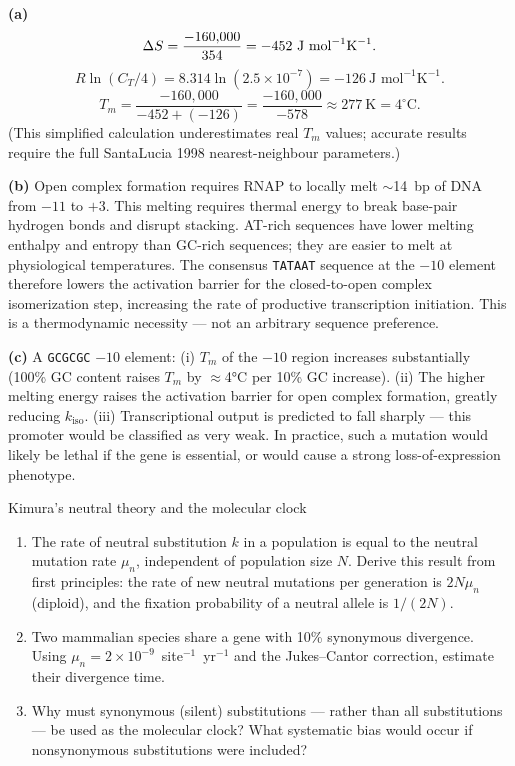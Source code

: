 \documentclass[12pt, a4paper, oneside]{report}
\begin{document}
\begin{solution}
  \textbf{(a)}
  \[
    \Delta S = \frac{-160{,}000}{354} = -452~\text{J mol}^{-1}\text{K}^{-1}.
  \]
  \[
    R\ln(C_T/4) = 8.314\ln(2.5\times10^{-7}) = -126~\text{J mol}^{-1}\text{K}^{-1}.
  \]
  \[
    T_m = \frac{-160{,}000}{-452 + (-126)} = \frac{-160{,}000}{-578}
        \approx 277~\text{K} = 4^\circ\text{C.}
  \]
  (This simplified calculation underestimates real $T_m$ values; accurate
  results require the full SantaLucia 1998 nearest-neighbour parameters.)

  \textbf{(b)} Open complex formation requires RNAP to locally melt
  $\sim$14~bp of DNA from $-11$ to $+3$. This melting requires thermal
  energy to break base-pair hydrogen bonds and disrupt stacking. AT-rich
  sequences have lower melting enthalpy and entropy than GC-rich sequences;
  they are easier to melt at physiological temperatures. The consensus
  \texttt{TATAAT} sequence at the $-10$ element therefore lowers the
  activation barrier for the closed-to-open complex isomerization step,
  increasing the rate of productive transcription initiation. This is
  a thermodynamic necessity — not an arbitrary sequence preference.

  \textbf{(c)} A \texttt{GCGCGC} $-10$ element: (i) $T_m$ of the $-10$
  region increases substantially (100\% GC content raises $T_m$ by
  $\approx$4°C per 10\% GC increase). (ii) The higher melting energy
  raises the activation barrier for open complex formation, greatly
  reducing $k_\text{iso}$. (iii) Transcriptional output is predicted to
  fall sharply — this promoter would be classified as very weak. In practice,
  such a mutation would likely be lethal if the gene is essential, or
  would cause a strong loss-of-expression phenotype.
\end{solution}

\begin{problem}{\enspace{}\enspace{}\enspace Kimura's neutral theory and the molecular clock}

  \begin{enumerate}
    \item The rate of neutral substitution $k$ in a population is
          equal to the neutral mutation rate $\mu_n$, independent of
          population size $N$. Derive this result from first principles:
          the rate of new neutral mutations per generation is $2N\mu_n$
          (diploid), and the fixation probability of a neutral allele
          is $1/(2N)$.
    \item Two mammalian species share a gene with 10\% synonymous
          divergence. Using $\mu_n = 2\times10^{-9}$~site$^{-1}$~yr$^{-1}$
          and the Jukes--Cantor correction, estimate their divergence time.
    \item Why must synonymous (silent) substitutions — rather than all
          substitutions — be used as the molecular clock? What systematic
          bias would occur if nonsynonymous substitutions were included?
  \end{enumerate}
\end{problem}
\end{document}
